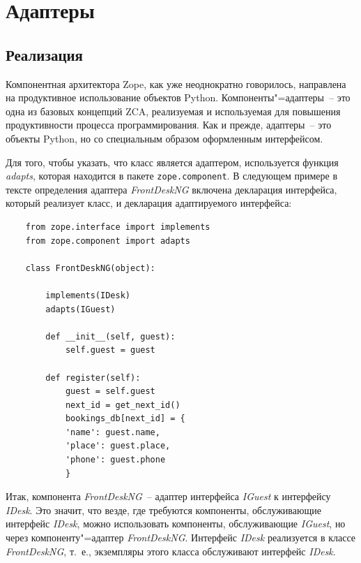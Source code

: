 \documentclass[a4paper,openany,twoside,final]{book}
\providecommand*{\DUroletitlereference}[1]{\textsl{#1}}
\begin{document}
\chapter{Адаптеры%
  \label{id33}%
}


\section{Реализация%
  \label{id34}%
}

Компонентная архитектора Zope, как уже неоднократно говорилось, направлена на продуктивное использование объектов Python.  Компоненты"=адаптеры~-- это одна из базовых концепций ZCA, реализуемая и используемая для повышения продуктивности процесса программирования.  Как и прежде, адаптеры~-- это объекты Python, но со специальным образом оформленным интерфейсом.

Для того, чтобы указать, что класс является адаптером, используется функция \DUroletitlereference{adapts}, которая находится в пакете \texttt{zope.component}.  В следующем примере в тексте определения адаптера \DUroletitlereference{FrontDeskNG} включена декларация интерфейса, который реализует класс, и декларация адаптируемого интерфейса:

\begin{verbatim}
    from zope.interface import implements
    from zope.component import adapts

    class FrontDeskNG(object):

        implements(IDesk)
        adapts(IGuest)

        def __init__(self, guest):
            self.guest = guest

        def register(self):
            guest = self.guest
            next_id = get_next_id()
            bookings_db[next_id] = {
            'name': guest.name,
            'place': guest.place,
            'phone': guest.phone
            }
\end{verbatim}

Итак, компонента \DUroletitlereference{FrontDeskNG}~-- адаптер интерфейса \DUroletitlereference{IGuest} к интерфейсу \DUroletitlereference{IDesk}.  Это значит, что везде, где требуются компоненты, обслуживающие интерфейс \DUroletitlereference{IDesk}, можно использовать компоненты, обслуживающие \DUroletitlereference{IGuest}, но через компоненту"=адаптер \DUroletitlereference{FrontDeskNG}.  Интерфейс \DUroletitlereference{IDesk} реализуется в классе \DUroletitlereference{FrontDeskNG}, т.~е., экземпляры этого класса обслуживают интерфейс \DUroletitlereference{IDesk}.
\end{document}
